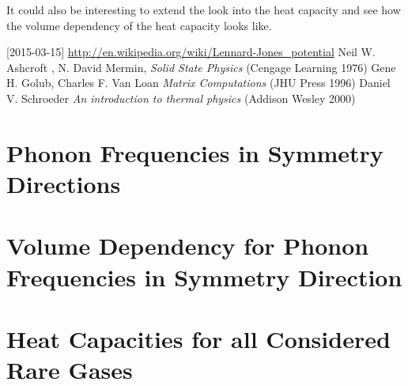 \documentclass[11pt]{article}
\newlength\figureheight
\newlength\figurewidth
\newif\iftikz
\begin{document}
It could also be interesting to extend the look into the heat capacity and see how the volume dependency of the heat capacity looks like.

\begin{thebibliography}{99}
 [2015-03-15] \url{http://en.wikipedia.org/wiki/Lennard-Jones_potential}
 Neil W. Ashcroft , N. David Mermin, \textit{Solid State Physics} (Cengage Learning 1976)
 Gene H. Golub, Charles F. Van Loan \textit{Matrix Computations} (JHU Press 1996)
 Daniel V. Schroeder \textit{An introduction to thermal physics} (Addison Wesley 2000)
\end{thebibliography}

\appendix
\section{Phonon Frequencies in Symmetry Directions}
\iftikz
\begin{figure}[H]
	\centering
	\setlength\figureheight{15cm} 
	\setlength\figurewidth{15cm}
	
	\caption{The phonon frequencies in the rare gas solids plotted in different symmetry directions for different rare gases. The x-axis shows the position in the lattice as it goes in different symmetry directions.}
	\label{fig:Freq}
\end{figure}
\fi
\newpage
\section{Volume Dependency for Phonon Frequencies in Symmetry Direction}
\iftikz
\begin{figure}[H]
	\centering
	\setlength\figureheight{18cm} 
	\setlength\figurewidth{14cm}
	
	\caption{The volume dependency of the phonon frequencies in the rare gas solids plotted in different symmetry directions for different rare gases. The x-axis shows the position in the lattice as it goes in different symmetry directions.}
	\label{fig:VolDep}
\end{figure}
\fi
\newpage

\newpage
\section{Heat Capacities for all Considered Rare Gases}
\iftikz
\begin{figure}[H]
	\centering
	\setlength\figureheight{16cm} 
	\setlength\figurewidth{14cm}
	
	\caption{The heat capacity plotted for all rare gas solids considered in this report}
	\label{fig:Cv}
\end{figure}
\fi
\end{document}
